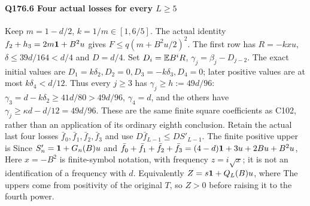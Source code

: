 \paragraph{Q176.6 Four actual losses for every $L\ge\allowbreak 5$}\label{part:Q176.6}
Keep $m=\allowbreak 1-d/2$, $k=\allowbreak 1/m\in[1,\allowbreak 6/5]$.
The actual identity $f_2+h_3=\allowbreak 2m\mathbf1+B^2u$ gives
$F\le\allowbreak  q(m+B^2u/2)^2$.
The first row has $R=\allowbreak -kxu$, $\delta\le\allowbreak 39d/164<\allowbreak d/4$ and $D=\allowbreak d/4$.
Set $D_i=\allowbreak \mathbb E B^iR$, $\gamma_j=\allowbreak \beta_j-D_{j-2}$.
The exact initial values are $D_1=\allowbreak k\delta_2,\allowbreak D_2=\allowbreak 0,\allowbreak D_3=\allowbreak -k\delta_3,\allowbreak D_4=\allowbreak 0$;
later positive values are at most $k\delta_4<\allowbreak d/12$.
Thus every $j\ge\allowbreak 3$ has $\gamma_j\ge\allowbreak  h:=\allowbreak 49d/96$:
$\gamma_3=\allowbreak d-k\delta_2\ge\allowbreak 41d/80>\allowbreak 49d/96$, $\gamma_4=\allowbreak d$, and the others
have $\gamma_j\ge\allowbreak \kappa d-d/12=\allowbreak 49d/96$.
These are the same finite square coefficients as C102, rather than an
application of its ordinary eighth conclusion.
Retain the actual last four losses $\bar f_0,\allowbreak \bar f_1,\allowbreak \bar f_2,\allowbreak \bar f_3$
and use $D\bar f_{L-1}\le\allowbreak  DS'_{L-1}$.
The finite positive upper is
Since $S'_n=\allowbreak \mathbf1+G_n(B)u$ and
$\bar f_0+\bar f_1+\bar f_2+\bar f_3=\allowbreak (4-d)\mathbf1+3u+2Bu+B^2u$,
Here $x=\allowbreak -B^2$ is finite-symbol notation, with frequency $z=\allowbreak i\sqrt x$;
it is not an identification of a frequency with $d$.
Equivalently $Z=\allowbreak s\mathbf1+Q_L(B)u$, where
The uppers come from positivity of the original $T$, so $Z>\allowbreak 0$ before
raising it to the fourth power.

